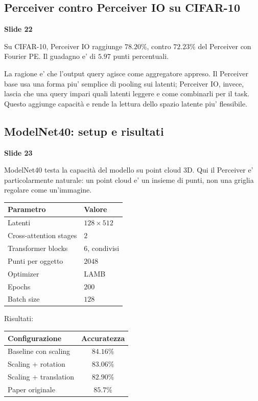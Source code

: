 \documentclass[11pt,a4paper]{article}
\newcommand{\slide}[1]{\textcolor{mainblue}{\textbf{Slide #1}}}
\begin{document}
\subsection{Perceiver contro Perceiver IO su CIFAR-10}
\slide{22}

Su CIFAR-10, Perceiver IO raggiunge $78.20\%$, contro $72.23\%$ del Perceiver
con Fourier PE. Il guadagno e' di $5.97$ punti percentuali.

La ragione e' che l'output query agisce come aggregatore appreso. Il Perceiver
base usa una forma piu' semplice di pooling sui latenti; Perceiver IO, invece,
lascia che una query impari quali latenti leggere e come combinarli per il
task. Questo aggiunge capacit\`a e rende la lettura dello spazio latente piu'
flessibile.

\subsection{ModelNet40: setup e risultati}
\slide{23}

ModelNet40 testa la capacit\`a del modello su point cloud 3D. Qui il Perceiver
e' particolarmente naturale: un point cloud e' un insieme di punti, non una
griglia regolare come un'immagine.

\begin{center}
\begin{tabular}{ll}
\toprule
\textbf{Parametro} & \textbf{Valore} \\
\midrule
Latenti & $128 \times 512$ \\
Cross-attention stages & $2$ \\
Transformer blocks & $6$, condivisi \\
Punti per oggetto & $2048$ \\
Optimizer & LAMB \\
Epochs & $200$ \\
Batch size & $128$ \\
\bottomrule
\end{tabular}
\end{center}

Risultati:
\begin{center}
\begin{tabular}{lc}
\toprule
\textbf{Configurazione} & \textbf{Accuratezza} \\
\midrule
Baseline con scaling & $84.16\%$ \\
Scaling + rotation & $83.06\%$ \\
Scaling + translation & $82.90\%$ \\
Paper originale & $85.7\%$ \\
\bottomrule
\end{tabular}
\end{center}
\end{document}
